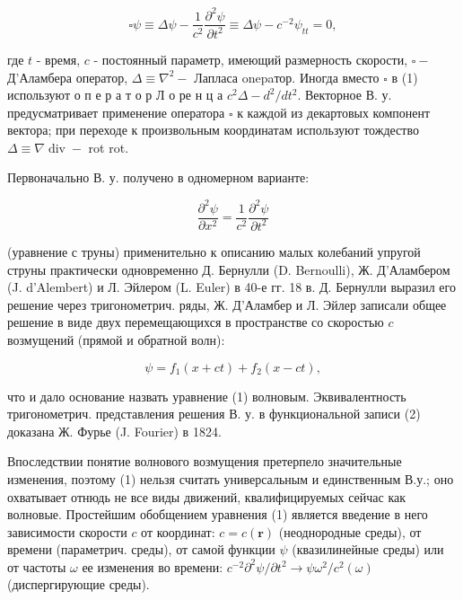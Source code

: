 \documentclass[10pt]{article}
\begin{document}
\[

\square \psi \equiv \Delta \psi-\frac{1}{c^{2}} \frac{\partial^{2} \psi}{\partial t^{2}} \equiv \Delta \psi-c^{-2} \psi_{t t}=0,

\]



где $t$ - время, $c$ - постоянный параметр, имеющий размерность скорости, $\square-$ Д'Аламбера оператор, $\Delta \equiv \nabla^{2}-$ Лапласа onepaтор. Иногда вместо $\square$ в (1) используют о п е р а т о р Л о ре н ц а $c^{2} \Delta-d^{2} / d t^{2}$. Векторное В. у. предусматривает применение оператора $\square$ к каждой из декартовых компонент вектора; при переходе к произвольным координатам используют тождество $\Delta \equiv \nabla \operatorname{div}-$ rot rot.



Первоначально В. у. получено в одномерном варианте:



\[

\frac{\partial^{2} \psi}{\partial x^{2}}=\frac{1}{c^{2}} \frac{\partial^{2} \psi}{\partial t^{2}}

\]



(уравнение с труны) применительно к описанию малых колебаний упругой струны практически одновременно Д. Бернулли (D. Bernoulli), Ж. Д’Аламбером (J. d'Alembert) и Л. Эйлером (L. Euler) в 40-е гг. 18 в. Д. Бернулли выразил его решение через тригонометрич. ряды, Ж. Д'Аламбер и Л. Эйлер записали общее решение в виде двух перемещающихся в пространстве со скоростью $c$ возмущений (прямой и обратной волн):



\[

\psi=f_{1}(x+c t)+f_{2}(x-c t),

\]



что и дало основание назвать уравнение (1) волновым. Эквивалентность тригонометрич. представления решения В. у. в функциональной записи (2) доказана Ж. Фурье (J. Fourier) в 1824.



Впоследствии понятие волнового возмущения претерпело значительные изменения, поэтому (1) нельзя считать универсальным и единственным В.у.; оно охватывает отнюдь не все виды движений, квалифицируемых сейчас как волновые. Простейшим обобщением уравнения (1) является введение в него зависимости скорости $c$ от координат: $c=c(\boldsymbol{r})$ (неоднородные среды), от времени (параметрич. среды), от самой функции $\psi$ (квазилинейные среды) или от частоты $\omega$ ее изменения во времени: $c^{-2} \partial^{2} \psi / \partial t^{2} \rightarrow \psi \omega^{2} / c^{2}(\omega)$ (диспергирующие среды).
\end{document}
